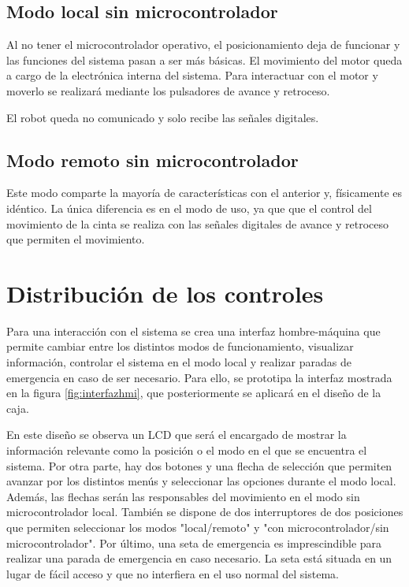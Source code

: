\subsection{Modo local sin microcontrolador}\label{subsec-03}

Al no tener el microcontrolador operativo, el posicionamiento deja de funcionar y las funciones del
sistema pasan a ser más básicas. El movimiento del motor queda a cargo de la electrónica interna del
sistema. Para interactuar con el motor y moverlo se realizará mediante los pulsadores de avance y 
retroceso.

El robot queda no comunicado y solo recibe las señales digitales.

\subsection{Modo remoto sin microcontrolador}\label{subsec-04}

Este modo comparte la mayoría de características con el anterior y, físicamente es idéntico. La 
única diferencia es en el modo de uso, ya que que el control del movimiento de la cinta se realiza
con las señales digitales de avance y retroceso que permiten el movimiento.

\section{Distribución de los controles}

Para una interacción con el sistema se crea una interfaz hombre-máquina que permite cambiar entre los
distintos modos de funcionamiento, visualizar información, controlar el sistema en el modo local y realizar
paradas de emergencia en caso de ser necesario. Para ello, se prototipa la interfaz mostrada en la figura 
\ref{fig:interfazhmi}, que posteriormente se aplicará en el diseño de la caja.

En este diseño se observa un LCD que será el encargado de mostrar la información relevante como la posición o
el modo en el que se encuentra el sistema. Por otra parte, hay dos botones y una flecha de selección
que permiten avanzar por los distintos menús y seleccionar las opciones durante el modo local. Además, las flechas
serán las responsables del movimiento en el modo sin microcontrolador local. También se dispone de dos interruptores
de dos posiciones que permiten seleccionar los modos "local/remoto" y "con microcontrolador/sin microcontrolador".
Por último, una seta de emergencia es imprescindible para realizar una parada de emergencia en caso necesario. La 
seta está situada en un lugar de fácil acceso y que no interfiera en el uso normal del sistema.

